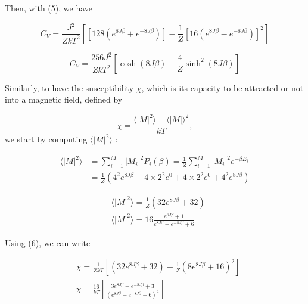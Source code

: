 \documentclass[a4paper, twoside, 11pt]{report}
\theoremstyle{theorem}
\theoremstyle{remark}
\theoremstyle{exemple}
\begin{document}
            Then, with (5), we have
            
                \begin{equation*}
                    C_V = \frac{J^2}{ZkT^2}\left[\left[128\left(e^{8J\beta} + e^{-8J\beta}\right)\right] - \frac{1}{Z}\left[16\left(e^{8J\beta}-e^{-8J\beta}\right)\right]^2\right]   
                \end{equation*}
                
                \begin{equation*}
                    \boxed{C_V = \frac{256J^2}{ZkT^2}\left[\cosh(8J\beta) - \frac{4}{Z}\sinh^2(8J\beta)\right]}
                    \tag{8}
                \end{equation*}
                
            Similarly, to have the susceptibility $\chi$, which is its capacity to be attracted or not into a magnetic field, defined by
            
                \begin{equation*}
                    \chi = \frac{\langle |M|^2 \rangle - \langle |M| \rangle ^2}{kT},
                \end{equation*}
            we start by computing $\langle |M|^2 \rangle$ :
            
                \begin{align*}
                    \langle |M|^2 \rangle &= \sum\limits_{i=1}^{M} |M_i|^2P_i(\beta) = \frac{1}{Z}\sum\limits_{i=1}^{M}|M_i|^2 e^{-\beta E_i} \\
                    &= \frac{1}{Z}\left(4^2e^{8J\beta} + 4 \times 2^2 e^{0} + 4 \times 2^2 e^{0} + 4^2e^{8J\beta}\right) 
                \end{align*}
                
                \begin{align*}
                    &\boxed{\langle |M|^2 \rangle = \frac{1}{Z}\left( 32e^{8J\beta} + 32 \right)} \tag{9}\\
                    &\langle |M|^2 \rangle = 16 \frac{e^{8J\beta}+1}{e^{8J\beta} + e^{-8J\beta} + 6}
                \end{align*}
                
            Using (6), we can write
            
                \begin{align*}
                    &\boxed{\chi = \frac{1}{ZkT}\left[\left(32e^{8J\beta}+32\right)-\frac{1}{Z}\left(8e^{8J\beta}+16\right)^2\right]} \tag{10}\\
                    &\chi = \frac{16}{kT}\left[\frac{3e^{8J\beta}+e^{-8J\beta}+3}{(e^{8J\beta}+e^{-8J\beta}+6)^2}\right]
                \end{align*}            
            
\end{document}
